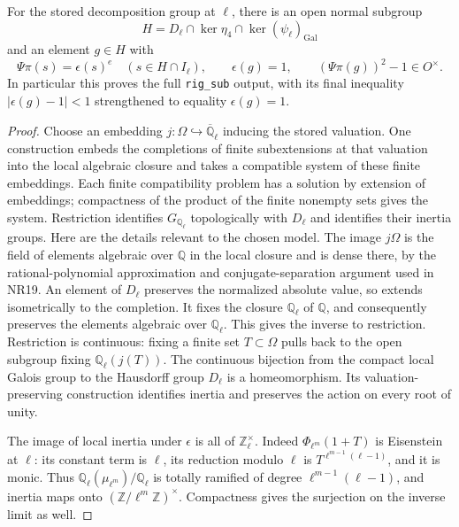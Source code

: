 \begin{lemma}
\label{claim:HSR3}
For the stored decomposition group at $\ell$, there is an open
normal subgroup
\[
 H=D_\ell\cap\ker\eta_4\cap\ker(\psi_\ell)_{\mathrm{Gal}}
 \tag{HSR.15}
\]
and an element $g\in H$ with
\[
 \Psi\pi(s)=\epsilon(s)^e\quad(s\in H\cap I_\ell),\qquad
 \epsilon(g)=1,\qquad (\Psi\pi(g))^2-1\in O^\times.
 \tag{HSR.16}
\]
In particular this proves the full \texttt{rig\_sub} output, with
its final inequality $|\epsilon(g)-1|<1$ strengthened to equality
$\epsilon(g)=1$.
\end{lemma}
\begin{proof}
Choose an embedding $j:\Omega\hookrightarrow
\overline{\mathbb Q}_\ell$ inducing the stored valuation.  One
construction embeds the completions of finite subextensions at
that valuation into the local algebraic closure and takes a
compatible system of these finite embeddings.  Each finite
compatibility problem has a solution by extension of embeddings;
compactness of the product of the finite nonempty sets gives the
system.  Restriction identifies $G_{\mathbb Q_\ell}$
topologically with $D_\ell$ and identifies their inertia groups.
Here are the details relevant to the chosen model.  The image
$j\Omega$ is the field of elements algebraic over $\mathbb Q$
in the local closure and is dense there, by the rational-polynomial
approximation and conjugate-separation argument used in NR19.
An element of $D_\ell$ preserves the normalized absolute value,
so extends isometrically to the completion.  It fixes the closure
$\mathbb Q_\ell$ of $\mathbb Q$, and consequently preserves
the elements algebraic over $\mathbb Q_\ell$.  This gives the
inverse to restriction.  Restriction is continuous: fixing a finite
set $T\subset\Omega$ pulls back to the open subgroup fixing
$\mathbb Q_\ell(j(T))$.  The continuous bijection from the compact
local Galois group to the Hausdorff group $D_\ell$ is a
homeomorphism.  Its valuation-preserving construction identifies
inertia and preserves the action on every root of unity.

The image of local inertia under $\epsilon$ is all of
$\mathbb Z_\ell^\times$.  Indeed
$\Phi_{\ell^m}(1+T)$ is Eisenstein at $\ell$: its constant term
is $\ell$, its reduction modulo $\ell$ is
$T^{\ell^{m-1}(\ell-1)}$, and it is monic.  Thus
$\mathbb Q_\ell(\mu_{\ell^m})/\mathbb Q_\ell$ is totally
ramified of degree $\ell^{m-1}(\ell-1)$, and inertia maps onto
$(\mathbb Z/\ell^m\mathbb Z)^\times$.  Compactness gives the
surjection on the inverse limit as well.


\end{proof}
